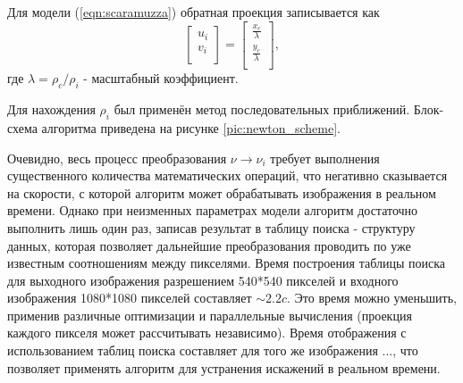 
Для модели (\ref{eqn:scaramuzza}) обратная проекция записывается как 
\begin{equation}
    \label{eq:back_scara}
    \left[\begin{matrix}u_i\\v_i\\\end{matrix}\right] = \left[\begin{matrix} \frac{x_c}{\lambda}  \\  \frac{y_c}{\lambda} \\\end{matrix}\right],
\end{equation}  
где $\lambda = \rho_c / \rho_i$ - масштабный коэффициент. 

Для нахождения $\rho_i$ был применён метод последовательных приближений. Блок-схема алгоритма приведена на рисунке \ref{pic:newton_scheme}.


Очевидно, весь процесс преобразования $\nu \rightarrow \nu_i$ требует выполнения существенного количества математических операций, что 
негативно сказывается на скорости, с которой алгоритм может обрабатывать изображения в реальном времени. Однако при неизменных параметрах 
модели алгоритм достаточно выполнить лишь один раз, записав результат в таблицу поиска - структуру данных, которая позволяет дальнейшие 
преобразования проводить по уже известным соотношениям между пикселями. Время построения таблицы поиска для выходного изображения 
разрешением 540*540 пикселей и входного изображения 1080*1080 пикселей составляет $\sim 2.2c$. %
Это время можно уменьшить, применив различные оптимизации и параллельные вычисления (проекция каждого пикселя может рассчитывать независимо). %
Время отображения с использованием таблиц поиска составляет для того же изображения $ ... $, что позволяет применять алгоритм для устранения 
искажений в реальном времени.